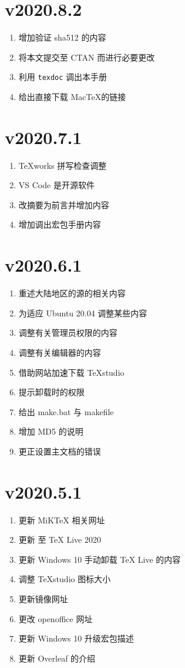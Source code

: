 \section*{v2020.8.2}

\begin{enumerate}
  \item 增加验证 sha512 的内容
  \item 将本文提交至 CTAN 而进行必要更改
  \item 利用 \texttt{texdoc} 调出本手册
  \item 给出直接下载 Mac\TeX 的链接
\end{enumerate}

\section*{v2020.7.1}

\begin{enumerate}
  \item \TeX works 拼写检查调整
  \item VS Code 是开源软件
  \item 改摘要为前言并增加内容
  \item 增加调出宏包手册内容
\end{enumerate}

\section*{v2020.6.1}

\begin{enumerate}
  \item 重述大陆地区的源的相关内容
  \item 为适应 Ubuntu 20.04 调整某些内容
  \item 调整有关管理员权限的内容
  \item 调整有关编辑器的内容
  \item 借助网站加速下载 TeXstudio
  \item 提示卸载时的权限
  \item 给出 make.bat 与 makefile
  \item 增加 MD5 的说明
  \item 更正设置主文档的错误
\end{enumerate}

\section*{v2020.5.1}

\begin{enumerate}
  \item 更新 MiK\TeX{} 相关网址
  \item 更新 至 \TeX{} Live 2020
  \item 更新 Windows 10 手动卸载 \TeX{} Live 的内容
  \item 调整 \TeX studio 图标大小
  \item 更新镜像网址
  \item 更改 openoffice 网址
  \item 更新 Windows 10 升级宏包描述
  \item 更新 Overleaf 的介绍
\end{enumerate}

